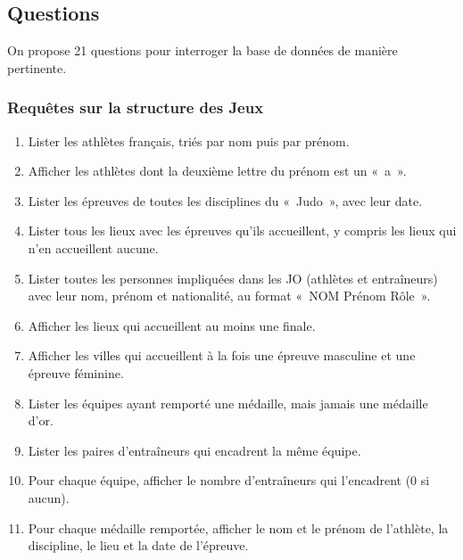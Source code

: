 \subsection{Questions}

On propose 21 questions pour interroger la base de données de manière pertinente.

\subsubsection{Requêtes sur la structure des Jeux}

\begin{enumerate}[itemsep=0pt]
  \item Lister les athlètes français, triés par nom puis par prénom.

  \item Afficher les athlètes dont la deuxième lettre du prénom est un «~a~».

  \item Lister les épreuves de toutes les disciplines du «~Judo~», avec leur date.

  \item Lister tous les lieux avec les épreuves qu'ils accueillent, y compris les lieux qui n'en accueillent aucune.

  \item Lister toutes les personnes impliquées dans les JO (athlètes et entraîneurs) avec leur nom, prénom et nationalité, au format «~NOM Prénom Rôle~».

  \item Afficher les lieux qui accueillent au moins une finale.

  \item Afficher les villes qui accueillent à la fois une épreuve masculine et une épreuve féminine.

  \item Lister les équipes ayant remporté une médaille, mais jamais une médaille d'or.

  \item Lister les paires d'entraîneurs qui encadrent la même équipe.

  \item Pour chaque équipe, afficher le nombre d'entraîneurs qui l'encadrent (0 si aucun).

  \item Pour chaque médaille remportée, afficher le nom et le prénom de l'athlète, la discipline, le lieu et la date de l'épreuve.


\end{enumerate}
